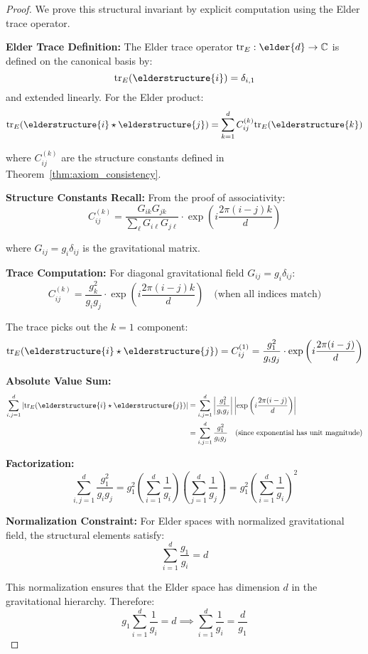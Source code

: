 \begin{proof}
We prove this structural invariant by explicit computation using the Elder trace operator.

\textbf{Elder Trace Definition:}
The Elder trace operator $\mathrm{tr}_E: \elder{d} \rightarrow \mathbb{C}$ is defined on the canonical basis by:
$$\mathrm{tr}_E(\elderstructure{i}) = \delta_{i,1}$$
and extended linearly. For the Elder product:
$$\mathrm{tr}_E(\elderstructure{i} \star \elderstructure{j}) = \sum_{k=1}^{d} C_{ij}^{(k)} \mathrm{tr}_E(\elderstructure{k})$$

where $C_{ij}^{(k)}$ are the structure constants defined in Theorem~\ref{thm:axiom_consistency}.

\textbf{Structure Constants Recall:}
From the proof of associativity:
$$C_{ij}^{(k)} = \frac{G_{ik}G_{jk}}{\sum_{\ell} G_{i\ell}G_{j\ell}} \cdot \exp\left(i\frac{2\pi(i-j)k}{d}\right)$$

where $G_{ij} = g_i \delta_{ij}$ is the gravitational matrix.

\textbf{Trace Computation:}
For diagonal gravitational field $G_{ij} = g_i \delta_{ij}$:
$$C_{ij}^{(k)} = \frac{g_k^2}{g_i g_j} \cdot \exp\left(i\frac{2\pi(i-j)k}{d}\right) \quad \text{(when all indices match)}$$

The trace picks out the $k=1$ component:
$$\mathrm{tr}_E(\elderstructure{i} \star \elderstructure{j}) = C_{ij}^{(1)} = \frac{g_1^2}{g_i g_j} \cdot \exp\left(i\frac{2\pi(i-j)}{d}\right)$$

\textbf{Absolute Value Sum:}
\begin{align}
\sum_{i,j=1}^{d} |\mathrm{tr}_E(\elderstructure{i} \star \elderstructure{j})| &= \sum_{i,j=1}^{d} \left|\frac{g_1^2}{g_i g_j}\right| \left|\exp\left(i\frac{2\pi(i-j)}{d}\right)\right| \\
&= \sum_{i,j=1}^{d} \frac{g_1^2}{g_i g_j} \quad \text{(since exponential has unit magnitude)}
\end{align}

\textbf{Factorization:}
$$\sum_{i,j=1}^{d} \frac{g_1^2}{g_i g_j} = g_1^2 \left(\sum_{i=1}^{d} \frac{1}{g_i}\right) \left(\sum_{j=1}^{d} \frac{1}{g_j}\right) = g_1^2 \left(\sum_{i=1}^{d} \frac{1}{g_i}\right)^2$$

\textbf{Normalization Constraint:}
For Elder spaces with normalized gravitational field, the structural elements satisfy:
$$\sum_{i=1}^{d} \frac{g_1}{g_i} = d$$

This normalization ensures that the Elder space has dimension $d$ in the gravitational hierarchy. Therefore:
$$g_1 \sum_{i=1}^{d} \frac{1}{g_i} = d \implies \sum_{i=1}^{d} \frac{1}{g_i} = \frac{d}{g_1}$$


\end{proof}
